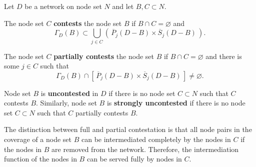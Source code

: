 \begin{definition} \label{contest}
Let $D$ be a network on node set $N$ and let $B,C \subset N$.
\begin{abet}
\item The node set $C$ \textbf{contests} the node set $B$ if $B \cap C = \varnothing$ and
\begin{equation}
\Gamma_D (B) \subset \bigcup_{j \in C} \left( \, \overline{P}_{j}(D - B) \times \overline{S}_{j}(D - B) \, \right) .
\end{equation}

\item The node set $C$ \textbf{partially contests} the node set $B$ if $B \cap C = \varnothing$ and there is some $j \in C$ such that
\begin{equation}
\Gamma_D (B) \cap \left[ \, \overline{P}_{j}(D - B) \times \overline{S}_{j}(D - B) \, \right] \neq \varnothing.
\end{equation}

\item Node set $B$ is \textbf{uncontested} in $D$ if there is no node set $C \subset N$ such that $C$ contests $B$. Similarly, node set $B$ is \textbf{strongly uncontested} if there is no node set $C \subset N$ such that $C$ partially contests $B$.
\end{abet}
\end{definition}
The distinction between full and partial contestation is that all node pairs in the coverage of a node set $B$ can be intermediated completely by the nodes in $C$ if the nodes in $B$ are removed from the network. Therefore, the intermediation function of the nodes in $B$ can be served fully by nodes in $C$.

